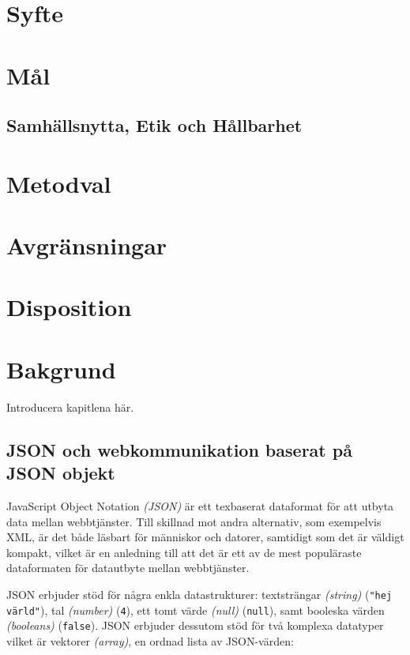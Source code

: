 \documentclass[swedish]{kththesis}
\begin{document}

\section{Syfte}

\section{Mål}

\subsection{Samhällsnytta, Etik och Hållbarhet}

\section{Metodval}

\section{Avgränsningar}

\section{Disposition}

\section{Bakgrund}
Introducera kapitlena här.

\subsection{JSON och webkommunikation baserat på JSON objekt}
\label{sec:intr:bakgrund:json}
JavaScript Object Notation \textit{(JSON)} är ett texbaserat dataformat för att utbyta data mellan webbtjänster. Till skillnad mot andra alternativ, som exempelvis XML, är det både läsbart för människor och datorer, samtidigt som det är väldigt kompakt, vilket är en anledning till att det är ett av de mest populäraste dataformaten för datautbyte mellan webbtjänster. \cite{Pezoa2016} 

JSON erbjuder stöd för några enkla datastrukturer: textsträngar \textit{(string)} (\texttt{"hej värld"}), tal \textit{(number)} (\texttt{4}), ett tomt värde \textit{(null)} (\texttt{null}), samt booleska värden \textit{(booleans)} (\texttt{false}). JSON erbjuder dessutom stöd för två komplexa datatyper vilket är vektorer \textit{(array)}, en ordnad lista av JSON-värden:
\end{document}

